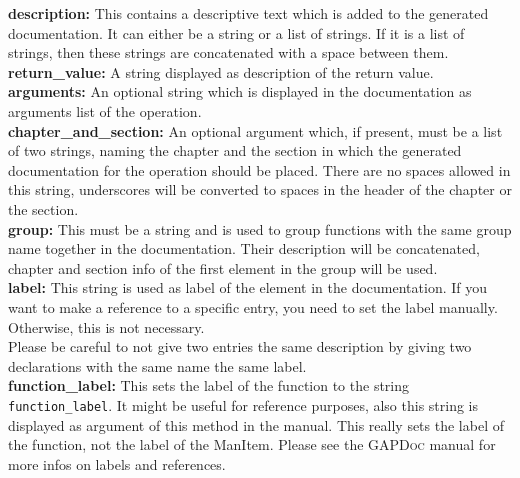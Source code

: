 \documentclass[margin=0cm,innermargin=0.7cm,blockverticalspace=0.5cm]{tikzposter}
\begin{document}
\begin{columns}
{\textbf{description: }
  This contains a descriptive text which is added to the generated documentation.
  It can either be a string or a list of strings. If it is a list of strings, then these
  strings are concatenated with a space between them.\\
\textbf{return\_value: }
  A string displayed as description of the return value.\\
\textbf{arguments: }
  An optional string which is displayed in the documentation as arguments list of the operation.\\
\textbf{chapter\_and\_section: }
  An optional argument which, if present, must be a list of two strings, naming the chapter
  and the section in which the generated documentation for the operation should be placed.
  There are no spaces allowed in this string, underscores will be converted to spaces in
  the header of the chapter or the section.\\
\textbf{group: }
  This must be a string and is used to group functions with the same group name together
  in the documentation. Their description will be concatenated, chapter and section info
  of the first element in the group will be used.\\
\textbf{label: }
  This string is used as label of the element in the documentation. If you want to make a
  reference to a specific entry, you need to set the label manually.
  Otherwise, this is not necessary.\\
  Please be careful to not give two entries the same description by giving two declarations with
  the same name the same label.\\
\textbf{function\_label: }
  This sets the label of the function to the string \texttt{function\_label}.
  It might be useful for reference purposes, also this string is displayed as argument
  of this method in the manual.
  This really sets the label of the function, not the label of the ManItem.
  Please see the \textsc{GAPDoc} manual for more infos on labels and references.
}



\end{columns}
\end{document}

